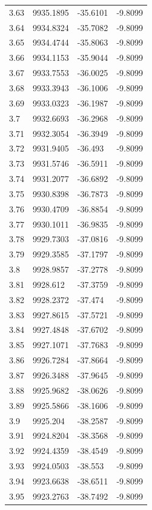 \begin{table}[H]
\begin{tabular}{llll}
3.63 & 9935.1895 & -35.6101 & -9.8099 \\
3.64 & 9934.8324 & -35.7082 & -9.8099 \\
3.65 & 9934.4744 & -35.8063 & -9.8099 \\
3.66 & 9934.1153 & -35.9044 & -9.8099 \\
3.67 & 9933.7553 & -36.0025 & -9.8099 \\
3.68 & 9933.3943 & -36.1006 & -9.8099 \\
3.69 & 9933.0323 & -36.1987 & -9.8099 \\
3.7 & 9932.6693 & -36.2968 & -9.8099 \\
3.71 & 9932.3054 & -36.3949 & -9.8099 \\
3.72 & 9931.9405 & -36.493 & -9.8099 \\
3.73 & 9931.5746 & -36.5911 & -9.8099 \\
3.74 & 9931.2077 & -36.6892 & -9.8099 \\
3.75 & 9930.8398 & -36.7873 & -9.8099 \\
3.76 & 9930.4709 & -36.8854 & -9.8099 \\
3.77 & 9930.1011 & -36.9835 & -9.8099 \\
3.78 & 9929.7303 & -37.0816 & -9.8099 \\
3.79 & 9929.3585 & -37.1797 & -9.8099 \\
3.8 & 9928.9857 & -37.2778 & -9.8099 \\
3.81 & 9928.612 & -37.3759 & -9.8099 \\
3.82 & 9928.2372 & -37.474 & -9.8099 \\
3.83 & 9927.8615 & -37.5721 & -9.8099 \\
3.84 & 9927.4848 & -37.6702 & -9.8099 \\
3.85 & 9927.1071 & -37.7683 & -9.8099 \\
3.86 & 9926.7284 & -37.8664 & -9.8099 \\
3.87 & 9926.3488 & -37.9645 & -9.8099 \\
3.88 & 9925.9682 & -38.0626 & -9.8099 \\
3.89 & 9925.5866 & -38.1606 & -9.8099 \\
3.9 & 9925.204 & -38.2587 & -9.8099 \\
3.91 & 9924.8204 & -38.3568 & -9.8099 \\
3.92 & 9924.4359 & -38.4549 & -9.8099 \\
3.93 & 9924.0503 & -38.553 & -9.8099 \\
3.94 & 9923.6638 & -38.6511 & -9.8099 \\
3.95 & 9923.2763 & -38.7492 & -9.8099 \\

\end{tabular}
\end{table}
